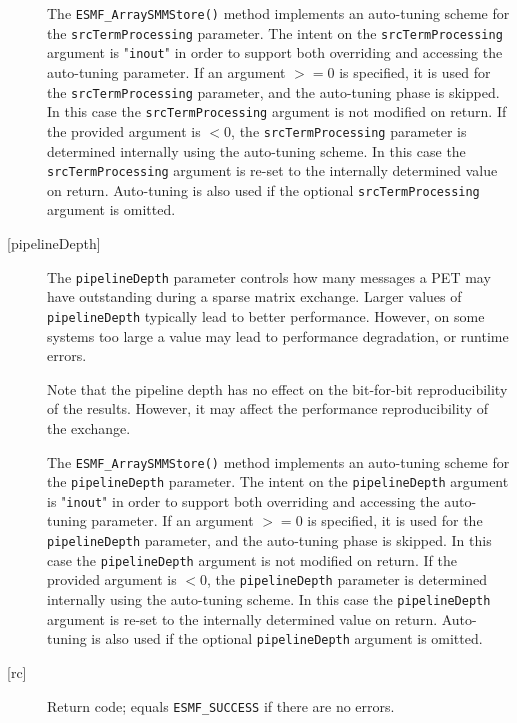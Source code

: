 \begin{description}
       \begin{sloppypar}
       The {\tt ESMF\_ArraySMMStore()} method implements an auto-tuning scheme
       for the {\tt srcTermProcessing} parameter. The intent on the 
       {\tt srcTermProcessing} argument is "{\tt inout}" in order to 
       support both overriding and accessing the auto-tuning parameter.
       If an argument $>= 0$ is specified, it is used for the 
       {\tt srcTermProcessing} parameter, and the auto-tuning phase is skipped.
       In this case the {\tt srcTermProcessing} argument is not modified on
       return. If the provided argument is $< 0$, the {\tt srcTermProcessing}
       parameter is determined internally using the auto-tuning scheme. In this
       case the {\tt srcTermProcessing} argument is re-set to the internally
       determined value on return. Auto-tuning is also used if the optional 
       {\tt srcTermProcessing} argument is omitted.
       \end{sloppypar}
       
     \item [{[pipelineDepth]}]
       The {\tt pipelineDepth} parameter controls how many messages a PET
       may have outstanding during a sparse matrix exchange. Larger values
       of {\tt pipelineDepth} typically lead to better performance. However,
       on some systems too large a value may lead to performance degradation,
       or runtime errors.
  
       Note that the pipeline depth has no effect on the bit-for-bit
       reproducibility of the results. However, it may affect the performance
       reproducibility of the exchange.
  
       The {\tt ESMF\_ArraySMMStore()} method implements an auto-tuning scheme
       for the {\tt pipelineDepth} parameter. The intent on the 
       {\tt pipelineDepth} argument is "{\tt inout}" in order to 
       support both overriding and accessing the auto-tuning parameter.
       If an argument $>= 0$ is specified, it is used for the 
       {\tt pipelineDepth} parameter, and the auto-tuning phase is skipped.
       In this case the {\tt pipelineDepth} argument is not modified on
       return. If the provided argument is $< 0$, the {\tt pipelineDepth}
       parameter is determined internally using the auto-tuning scheme. In this
       case the {\tt pipelineDepth} argument is re-set to the internally
       determined value on return. Auto-tuning is also used if the optional 
       {\tt pipelineDepth} argument is omitted.
       
     \item [{[rc]}]
       Return code; equals {\tt ESMF\_SUCCESS} if there are no errors.
     \end{description}
   
